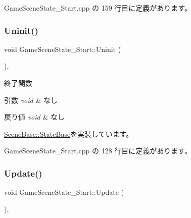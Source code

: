  Game\+Scene\+State\+\_\+\+Start.\+cpp の 159 行目に定義があります。

\mbox{\label{class_game_scene_state___start_a636df8b7ac0173b044b0efc2927fb83b}} 
\subsubsection{\texorpdfstring{Uninit()}{Uninit()}}
{\footnotesize\ttfamily void Game\+Scene\+State\+\_\+\+Start\+::\+Uninit (\begin{DoxyParamCaption}{ }\end{DoxyParamCaption})\hspace{0.3cm}{\ttfamily [override]}, {\ttfamily [virtual]}}



終了関数 


\begin{DoxyParams}{引数}
{\em void} & なし \\
\hline
\end{DoxyParams}

\begin{DoxyRetVals}{戻り値}
{\em void} & なし \\
\hline
\end{DoxyRetVals}


\mbox{\hyperlink{class_scene_base_1_1_state_base_a2763fa37e45b39bd8d3bbb735c76c59b}{Scene\+Base\+::\+State\+Base}}を実装しています。



 Game\+Scene\+State\+\_\+\+Start.\+cpp の 128 行目に定義があります。

\mbox{\label{class_game_scene_state___start_ae11bb8d8ea9eae4fea2a9acf33dd1c8b}} 
\subsubsection{\texorpdfstring{Update()}{Update()}}
{\footnotesize\ttfamily void Game\+Scene\+State\+\_\+\+Start\+::\+Update (\begin{DoxyParamCaption}{ }\end{DoxyParamCaption})\hspace{0.3cm}{\ttfamily [override]}, {\ttfamily [virtual]}}



